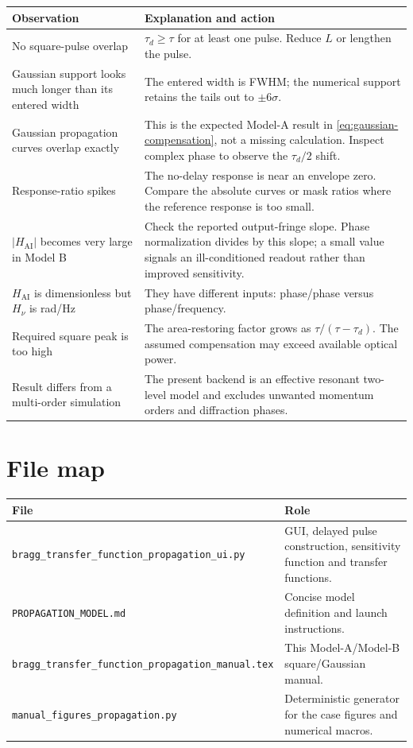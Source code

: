 \documentclass[11pt,a4paper]{article}
\newcommand{\Hatom}{H_{\mathrm{AI}}}
\newcommand{\Hnu}{H_{\nu}}
\newcommand{\taud}{\tau_{d}}
\begin{document}
\begin{longtable}{@{}>{\raggedright\arraybackslash}p{}>{\raggedright\arraybackslash}p{}@{}}
\toprule
Observation & Explanation and action \\
\midrule
\endhead
No square-pulse overlap & $\taud\geq\tau$ for at least one pulse. Reduce $L$ or lengthen the pulse. \\
Gaussian support looks much longer than its entered width & The entered width is FWHM; the numerical support retains the tails out to $\pm6\sigma$. \\
Gaussian propagation curves overlap exactly & This is the expected Model-A result in \cref{eq:gaussian-compensation}, not a missing calculation. Inspect complex phase to observe the $\taud/2$ shift. \\
Response-ratio spikes & The no-delay response is near an envelope zero. Compare the absolute curves or mask ratios where the reference response is too small. \\
$|\Hatom|$ becomes very large in Model B & Check the reported output-fringe slope. Phase normalization divides by this slope; a small value signals an ill-conditioned readout rather than improved sensitivity. \\
$\Hatom$ is dimensionless but $\Hnu$ is rad/Hz & They have different inputs: phase/phase versus phase/frequency. \\
Required square peak is too high & The area-restoring factor grows as $\tau/(\tau-\taud)$. The assumed compensation may exceed available optical power. \\
Result differs from a multi-order simulation & The present backend is an effective resonant two-level model and excludes unwanted momentum orders and diffraction phases. \\
\bottomrule
\end{longtable}

\section{File map}

\begin{tabularx}{\textwidth}{@{}lX@{}}
\toprule
File & Role \\
\midrule
\texttt{bragg\_transfer\_function\_propagation\_ui.py} & GUI, delayed pulse construction, sensitivity function and transfer functions. \\
\texttt{PROPAGATION\_MODEL.md} & Concise model definition and launch instructions. \\
\texttt{bragg\_transfer\_function\_propagation\_manual.tex} & This Model-A/Model-B square/Gaussian manual. \\
\texttt{manual\_figures\_propagation.py} & Deterministic generator for the case figures and numerical macros. \\
\bottomrule
\end{tabularx}
\end{document}
